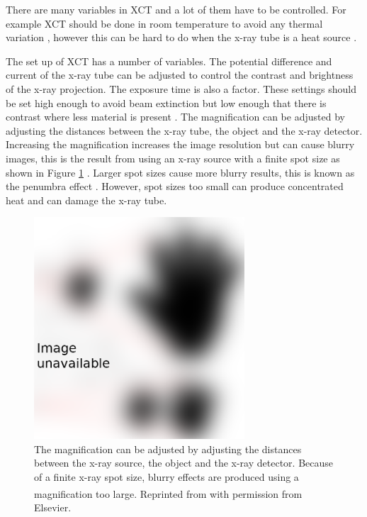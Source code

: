 There are many variables in XCT and a lot of them have to be controlled. For example XCT should be done in room temperature to avoid any thermal variation \citep{bryan1990international}, however this can be hard to do when the x-ray tube is a heat source \citep{kruth2011computed}.

The set up of XCT has a number of variables. The potential difference and current of the x-ray tube can be adjusted to control the contrast and brightness of the x-ray projection. The exposure time is also a factor. These settings should be set high enough to avoid beam extinction but low enough that there is contrast where less material is present \citep{kruth2011computed}. The magnification can be adjusted by adjusting the distances between the x-ray tube, the object and the x-ray detector. Increasing the magnification increases the image resolution but can cause blurry images, this is the result from using an x-ray source with a finite spot size as shown in Figure \ref{fig:literature_magnification} \citep{kruth2011computed}. Larger spot sizes cause more blurry results, this is known as the penumbra effect \citep{kueh2016modelling}. However, spot sizes too small can produce concentrated heat \citep{welkenhuyzen2009industrial} and can damage the x-ray tube.

\begin{figure}
  \centering
  \includegraphics[width=0.7\textwidth]{../figures/literatureReview/literature_magnification.png}
  \caption{The magnification can be adjusted by adjusting the distances between the x-ray source, the object and the x-ray detector. Because of a finite x-ray spot size, blurry effects are produced using a magnification too large. Reprinted from \cite{kruth2011computed}\textsuperscript{\textcopyright} with permission from Elsevier.}
  \label{fig:literature_magnification}
\end{figure}

